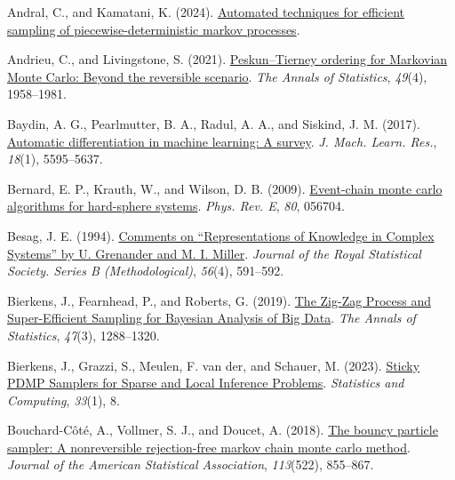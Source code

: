 \documentclass[
]{article}
\newlength{\cslhangindent}
\newenvironment{CSLReferences}[2] %
 {\begin{list}{}{%
  \setlength{\itemindent}{0pt}
  \setlength{\leftmargin}{0pt}
  \setlength{\parsep}{0pt}
  \ifodd #1
   \setlength{\leftmargin}{\cslhangindent}
   \setlength{\itemindent}{-1\cslhangindent}
  \fi
  \setlength{\itemsep}{#2\baselineskip}}}
 {\end{list}}
\theoremstyle{StatementsWithUnderline}\newtheorem{theorem}{定理}[section]\newtheorem{definition}[theorem]{定義}\newtheorem{corollary}[theorem]{系}\newtheorem{proposition}[theorem]{命題}\newtheorem{lemma}[theorem]{補題}\newtheorem{example}[theorem]{例}
\theoremstyle{definition}\newtheorem{notation}[theorem]{記法}\newtheorem{algorithm}[theorem]{算譜}\newtheorem{remarks}[theorem]{要諦}\newtheorem{remark}[theorem]{注}
\begin{document}
\begin{CSLReferences}{1}{1}
Andral, C., and Kamatani, K. (2024).
\href{https://arxiv.org/abs/2408.03682}{Automated techniques for
efficient sampling of piecewise-deterministic markov processes}.

Andrieu, C., and Livingstone, S. (2021).
\href{https://doi.org/10.1214/20-AOS2008}{{Peskun--Tierney ordering for
Markovian Monte Carlo: Beyond the reversible scenario}}. \emph{The
Annals of Statistics}, \emph{49}(4), 1958--1981.

Baydin, A. G., Pearlmutter, B. A., Radul, A. A., and Siskind, J. M.
(2017). \href{http://www.jmlr.org/papers/v18/17-468.html}{Automatic
differentiation in machine learning: A survey}. \emph{J. Mach. Learn.
Res.}, \emph{18}(1), 5595--5637.

Bernard, E. P., Krauth, W., and Wilson, D. B. (2009).
\href{https://doi.org/10.1103/PhysRevE.80.056704}{Event-chain monte
carlo algorithms for hard-sphere systems}. \emph{Phys. Rev. E},
\emph{80}, 056704.

Besag, J. E. (1994).
\href{https://www.jstor.org/stable/2346184}{{Comments on
{``Representations of Knowledge in Complex Systems''} by U. Grenander
and M. I. Miller}}. \emph{Journal of the Royal Statistical Society.
Series B (Methodological)}, \emph{56}(4), 591--592.

Bierkens, J., Fearnhead, P., and Roberts, G. (2019).
\href{https://doi.org/10.1214/18-AOS1715}{{The Zig-Zag Process and
Super-Efficient Sampling for Bayesian Analysis of Big Data}}. \emph{The
Annals of Statistics}, \emph{47}(3), 1288--1320.

Bierkens, J., Grazzi, S., Meulen, F. van der, and Schauer, M. (2023).
\href{https://doi.org/10.1007/s11222-022-10180-5}{{Sticky PDMP Samplers
for Sparse and Local Inference Problems}}. \emph{Statistics and
Computing}, \emph{33}(1), 8.

Bouchard-Côté, A., Vollmer, S. J., and Doucet, A. (2018).
\href{https://www.tandfonline.com/doi/full/10.1080/01621459.2017.1294075}{The
bouncy particle sampler: A nonreversible rejection-free markov chain
monte carlo method}. \emph{Journal of the American Statistical
Association}, \emph{113}(522), 855--867.


\end{CSLReferences}
\end{document}
